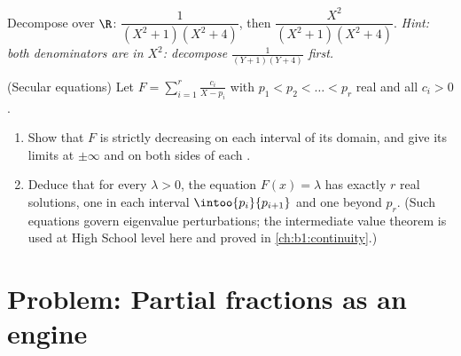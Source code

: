\begin{exercise}[$\star\star$]\label{exo:b1:fractions:11}
Decompose over $\R$: $\dfrac{1}{(X^2+1)(X^2+4)}$, then
$\dfrac{X^2}{(X^2+1)(X^2+4)}$. \emph{Hint: both denominators are
 in $X^2$: decompose $\frac1{(Y+1)(Y+4)}$ first.}
\end{exercise}

\begin{exercise}[$\star\star\star$]\label{exo:b1:fractions:12}
(Secular equations) Let $F = \sum_{i=1}^{r} \frac{c_i}{X - p_i}$
with $p_1 < p_2 < \dots < p_r$ real and all $c_i > 0$.
\begin{enumerate}
  \item Show that $F$ is strictly decreasing on each interval of
        its domain, and give its limits at $\pm\infty$ and on both
        sides of each .
  \item Deduce that for every $\lambda > 0$, the equation $F(x) =
        \lambda$ has exactly $r$ real solutions, one in each
        interval $\intoo{p_i}{p_{i+1}}$ and one beyond $p_r$.
        (Such equations govern eigenvalue perturbations; the
        intermediate value theorem is used at High School level
        here and proved in \cref{ch:b1:continuity}.)
\end{enumerate}
\end{exercise}

\section{Problem: Partial fractions as an engine}

